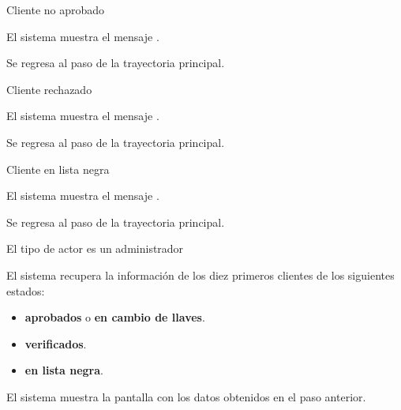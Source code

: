 {  \begin{trayectoriaAlternativa}
    {Cliente no aprobado}

    \item El sistema muestra el mensaje
      .

    \item Se regresa al paso  de la trayectoria
      principal.

  \end{trayectoriaAlternativa}


  \begin{trayectoriaAlternativa}
    {Cliente rechazado}

    \item El sistema muestra el mensaje
      .

    \item Se regresa al paso  de la trayectoria
      principal.

  \end{trayectoriaAlternativa}


  \begin{trayectoriaAlternativa}
    {Cliente en lista negra}

    \item El sistema muestra el mensaje
      .

    \item Se regresa al paso  de la trayectoria
      principal.

  \end{trayectoriaAlternativa}


  \begin{trayectoriaAlternativa}[ta:administrador]
    {El tipo de actor es un administrador}

    \item El sistema recupera la información de los diez primeros clientes
      de los siguientes estados:
      \begin{itemize}
        \item \textbf{aprobados} o \textbf{en cambio de llaves}.
        \item \textbf{verificados}.
        \item \textbf{en lista negra}.
      \end{itemize}

    \item El sistema muestra la pantalla
       con los datos obtenidos en el paso
      anterior.

  \end{trayectoriaAlternativa}
}
